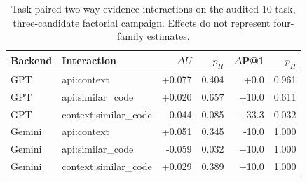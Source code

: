\begin{table}[t]
\centering
\small
\caption{Task-paired two-way evidence interactions on the audited 10-task, three-candidate factorial campaign. Effects do not represent four-family estimates.}
\label{tab:evidence_interactions_final}
\begin{tabular}{llrrrr}
\toprule
Backend & Interaction & $\Delta U$ & $p_H$ & $\Delta$P@1 & $p_H$ \\
\midrule
GPT & api:context & +0.077 & 0.404 & +0.0 & 0.961 \\
GPT & api:similar\_code & +0.020 & 0.657 & +10.0 & 0.611 \\
GPT & context:similar\_code & -0.044 & 0.085 & +33.3 & 0.032 \\
Gemini & api:context & +0.051 & 0.345 & -10.0 & 1.000 \\
Gemini & api:similar\_code & -0.059 & 0.032 & +10.0 & 1.000 \\
Gemini & context:similar\_code & +0.029 & 0.389 & +10.0 & 1.000 \\
\bottomrule
\end{tabular}
\end{table}
